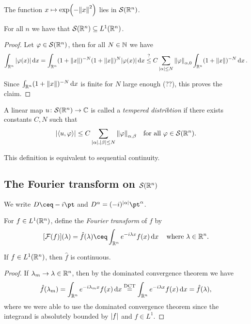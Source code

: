\begin{example}
	The function $x \mapsto \exp(-\norm{x}^2)$ lies in $\mathcal S(\mathbb R^n)$. 
\end{example}

\begin{proposition}
	For all $n$ we have that $\mathcal S(\mathbb R^n) \subseteq L^1(\mathbb R^n)$. 
\end{proposition}

\begin{proof}
	Let $\varphi \in \mathcal S(\mathbb R^n)$, then for all $N \in \mathbb N$ we have
	\[
	\int_{\mathbb R^n} \abs{\varphi(x)} \dd{x} = \int_{\mathbb R^n} (1 + \norm{x})^{-N} (1 + \norm{x})^N \abs{\varphi(x)} \dd{x} \overset?\leq C\sum_{\abs{\alpha} \leq N} \norm{\varphi}_{\alpha, 0} \int_{\mathbb R^n} (1 + \norm{x})^{-N} \dd{x}.
	\]
	
	Since $\int_{\mathbb R^n} (1 + \norm{x})^{-N} \dd{x}$ is finite for $N$ large enough (??), this proves the claim. 
\end{proof}


\begin{definition}
	A linear map $u \colon \mathcal S(\mathbb R^n) \to \mathbb C$ is called a \emph{tempered distribtion} if there exists constants $C, N$ such that
	\[
	\abs{\langle u, \varphi\rangle} \leq C \sum_{\abs{\alpha}, \abs{\beta} \leq N} \norm{\varphi}_{\alpha, \beta} \quad\text{for all $\varphi \in \mathcal S(\mathbb R^n)$}. 
	\]
\end{definition}
This definition is equivalent to sequential continuity. 

\subsection{The Fourier transform on $\mathcal S(\mathbb R^n)$}

\begin{convention}
	We write $D \ceq -i\pt$ and $D^\alpha = (-i)^{\abs{\alpha}} \pt^\alpha$. 
\end{convention}

\begin{definition}
	For $f \in L^1(\mathbb R^n)$, define the \emph{Fourier transform} of $f$ by  
	\[
	[\FF(f)](\lambda) = \hat f(\lambda) \ceq \int_{\RR^n} e^{-i\lambda x} f(x) \dd{x} \quad\text{where $\lambda \in \RR^n$}. 
	\]
\end{definition}

\begin{lemma}
	If $f \in L^1(\mathbb R^n)$, then $\hat f$ is continuous. 
\end{lemma}

\begin{proof}
	If $\lambda_m \to \lambda \in \mathbb R^n$, then by the dominated convergence theorem we have
	\[
	\hat f(\lambda_m) = \int_{\mathbb R^n} e^{-i\lambda_m x} f(x) \dd{x} \overset{\text{DCT}}= \int_{\mathbb R^n} e^{-i\lambda x} f(x) \dd{x} = \hat f(\lambda),
	\]
	where we were able to use the dominated convergence theorem since the integrand is absolutely bounded by $\abs{f}$ and $f \in L^1$. 
\end{proof}

